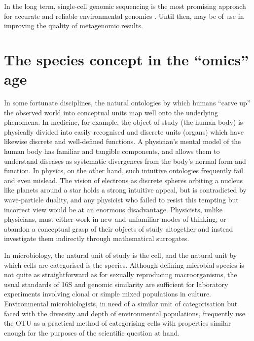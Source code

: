 In the long term, single-cell genomic sequencing is the most promising approach for accurate and reliable environmental genomics \cite{Blainey:2013dp}.
Until then,  may be of use in improving the quality of metagenomic results.

\section{The species concept in the ``omics'' age}

In some fortunate disciplines, the natural ontologies by which humans ``carve up'' the observed world into conceptual units map well onto the underlying phenomena.
In medicine, for example, the object of study (the human body) is physically divided into easily recognised and discrete units (organs) which have likewise discrete and well-defined functions.
A physician's mental model of the human body has familiar and tangible components, and allows them to understand diseases as systematic divergences from the body's normal form and function.
In physics, on the other hand, such intuitive ontologies frequently fail and even mislead.
The vision of electrons as discrete spheres orbiting a nucleus like planets around a star holds a strong intuitive appeal, but is contradicted by wave-particle duality, and any physicist who failed to resist this tempting but incorrect view would be at an enormous disadvantage.
Physicists, unlike physicians, must either work in new and unfamiliar modes of thinking, or abandon a conceptual grasp of their objects of study altogether and instead investigate them indirectly through mathematical surrogates.

In microbiology, the natural unit of study is the cell, and the natural unit by which cells are categorised is the species.
Although defining microbial species is not quite as straightforward as for sexually reproducing macroorganisms, the usual standards of 16S and genomic similarity are sufficient for laboratory experiments involving clonal or simple mixed populations in culture.
Environmental microbiologists, in need of a similar unit of categorisation but faced with the diversity and depth of environmental populations, frequently use the \ac{OTU} as a practical method of categorising cells with properties similar enough for the purposes of the scientific question at hand.

